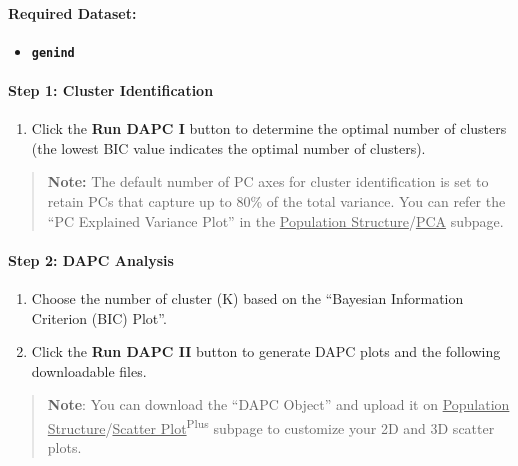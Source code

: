 \documentclass[
]{book}
\providecommand{\tightlist}{%
  \setlength{\itemsep}{0pt}\setlength{\parskip}{0pt}}
\begin{document}
\paragraph*{Required Dataset:}\label{required-dataset-2}

\begin{itemize}
\tightlist
\item
  {\textbf{\texttt{genind}}}
\end{itemize}

\paragraph*{\texorpdfstring{Step 1: \textbf{Cluster Identification}}{Step 1: Cluster Identification}}\label{step-1-cluster-identification}

\begin{enumerate}
\def\labelenumi{\arabic{enumi}.}
\tightlist
\item
  Click the {\textbf{Run DAPC I}} button to determine the optimal number of clusters (the lowest BIC value indicates the optimal number of clusters).
\end{enumerate}

\begin{quote}
\textbf{Note:} The default number of PC axes for cluster identification is set to retain PCs that capture up to 80\% of the total variance. You can refer the ``PC Explained Variance Plot'' in the \ul{Population Structure}/\ul{PCA} subpage.
\end{quote}

\paragraph*{\texorpdfstring{Step 2: \textbf{DAPC Analysis}}{Step 2: DAPC Analysis}}\label{step-2-dapc-analysis}

\begin{enumerate}
\def\labelenumi{\arabic{enumi}.}
\item
  Choose the number of cluster (K) based on the ``Bayesian Information Criterion (BIC) Plot''.
\item
  Click the {\textbf{Run DAPC II}} button to generate DAPC plots and the following downloadable files.
\end{enumerate}

\begin{quote}
\textbf{Note}: You can download the ``DAPC Object'' and upload it on \ul{Population Structure}/\ul{Scatter Plot}\textsuperscript{Plus} subpage to customize your 2D and 3D scatter plots.
\end{quote}
\end{document}
